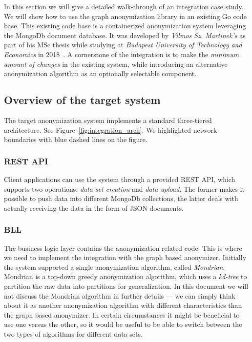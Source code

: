 In this section we will give a detailed walk-through of an integration case study. We will show how to use the graph anonymization library in an existing Go code base. This existing code base is a containerized anonymization system leveraging the MongoDb document database. It was developed by \emph{Vilmos Sz. Martinek's} as part of his MSc thesis while studying at \textit{Budapest University of Technology and Economics} in 2018~\cite{martinek}. A cornerstone of the integration is to make the \emph{minimum amount of changes} in the existing system, while introducing an alternative anonymization algorithm as an optionally selectable component.

\subsection{Overview of the target system}

The target anonymization system implements a standard three-tiered architecture. See Figure~\ref{fig:integration_arch}. We highlighted network boundaries with blue dashed lines on the figure.

\subsubsection{REST API}\label{subsubsec:rest_api}
Client applications can use the system through a provided REST API, which supports two operations: \emph{data set creation} and \emph{data upload}. The former makes it possible to push data into different MongoDb collections, the latter deals with actually receiving the data in the form of JSON documents.

\vspace{\baselineskip}


\subsubsection{BLL}
The business logic layer contains the anonymization related code. This is where we need to implement the integration with the graph based anonymizer. Initially the system supported a single anonymization algorithm, called \emph{Mondrian}. Mondrian is a top-down greedy anonymization algorithm, which uses a \emph{kd-tree} to partition the raw data into partitions for generalization. In this document we will not discuss the Mondrian algorithm in further details --- we can simply think about it as another anonymization algorithm with different characteristics than the graph based anonymizer. In certain circumstances it might be beneficial to use one versus the other, so it would be useful to be able to switch between the two types of algorithms for different data sets.

